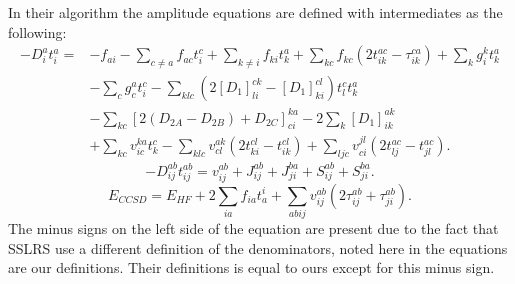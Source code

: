 \documentclass[graybox,sectrefs,envcountresetchap,open=right]{svmonodo}
\begin{document}
In their algorithm the amplitude equations are defined with intermediates as the following:
\begin{align}
- D_i^a t_i^a = &
- f_{ai} 
- \sum_{c \not= a} f_{ac} t_i^c 
+ \sum_{k \not= i} f_{ki} t_k^a
+ \sum_{kc} f_{kc} (2t_{ik}^{ac} - \tau_{ik}^{ca})
+ \sum_k g_i^k t_k^a \label{SSRS1} \\ &
- \sum_c g_c^a t_i^c 
- \sum_{klc} \left( 2 [D_1]_{li}^{ck} - [D_1]_{ki}^{cl} \right) t_l^c t_k^a \nonumber \\ &
- \sum_{kc} [2(D_{2A} - D_{2B}) + D_{2C}]_{ci}^{ka} 
- 2 \sum_k [D_1]_{ik}^{ak}  \nonumber \\ &
+ \sum_{kc} v_{ic}^{ka} t_k^c
- \sum_{klc} v_{cl}^{ak} ( 2 t_{ki}^{cl} - t_{ik}^{cl} )
+ \sum_{ljc} v_{ci}^{jl} ( 2 t_{lj}^{ac} - t_{jl}^{ac} ) .
\nonumber
\end{align}
\begin{equation}
- D_{ij}^{ab} t_{ij}^{ab} = v_{ij}^{ab} + J_{ij}^{ab} + J_{ji}^{ba} + S_{ij}^{ab} + S_{ji}^{ba} . \label{SSRS2}
\end{equation}
\begin{equation}
E_{CCSD} = E_{HF} + 2\sum_{ia} f_{ia} t_a^i 
+ \sum_{abij} v_{ij}^{ab} ( 2 \tau_{ij}^{ab}
+ \tau_{ji}^{ab} ) . \label{SSRS3}
\end{equation}
The minus signs on the left side of the equation are present due to the fact that SSLRS use a different definition of the denominators, noted here in the equations are our definitions. Their definitions is equal to ours except for this minus sign. \\
\end{document}
